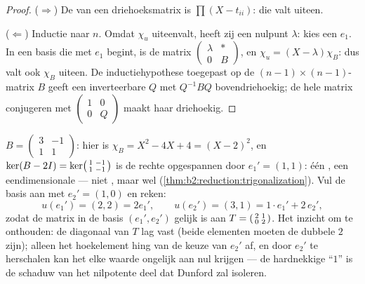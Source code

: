 \begin{proof}
($\Rightarrow$) De  van een driehoeksmatrix
is $\prod(X - t_{ii})$: die valt uiteen.

($\Leftarrow$) Inductie naar $n$. Omdat $\chi_u$ uiteenvalt, heeft
zij een nulpunt $\lambda$: kies een  $e_1$. In een basis
die met $e_1$ begint, is de matrix $\begin{pmatrix} \lambda &
\ast\\ 0 & B\end{pmatrix}$, en $\chi_u = (X - \lambda)\chi_B$: dus
valt ook $\chi_B$ uiteen. De inductiehypothese toegepast op de
$(n-1) \times (n-1)$-matrix $B$ geeft een inverteerbare $Q$ met
$Q^{-1}BQ$ bovendriehoekig; de hele matrix conjugeren met
$\begin{pmatrix}1 & 0\\ 0 & Q\end{pmatrix}$ maakt haar
driehoekig.
\end{proof}

\begin{example}\label{ex:b2:reduction:trigwork}
$B = \begin{pmatrix}3 & -1\\ 1 & 1\end{pmatrix}$: hier is $\chi_B =
X^2 - 4X + 4 = (X - 2)^2$, en $\ker(B - 2I) =
\ker\begin{psmallmatrix}1 & -1\\ 1 & -1\end{psmallmatrix}$ is de
rechte opgespannen door $e_1' = (1, 1)$: één , een
eendimensionale  --- niet , maar wel
 (\cref{thm:b2:reduction:trigonalization}). Vul de
basis aan met $e_2' = (1, 0)$ en reken:
\[
u(e_1') = (2, 2) = 2e_1',
\qquad
u(e_2') = (3, 1) = 1\cdot e_1' + 2\, e_2' ,
\]
zodat de matrix in de basis $(e_1', e_2')$ gelijk is aan $T =
\begin{psmallmatrix}2 & 1\\ 0 & 2\end{psmallmatrix}$. Het inzicht
om te onthouden: de diagonaal van $T$ lag vast (beide elementen
moeten de dubbele  $2$ zijn); alleen het hoekelement
hing van de keuze van $e_2'$ af, en door $e_2'$ te herschalen kan
het elke waarde ongelijk aan nul krijgen --- de hardnekkige ``$1$''
is de schaduw van het nilpotente deel dat Dunford zal isoleren.
\end{example}

